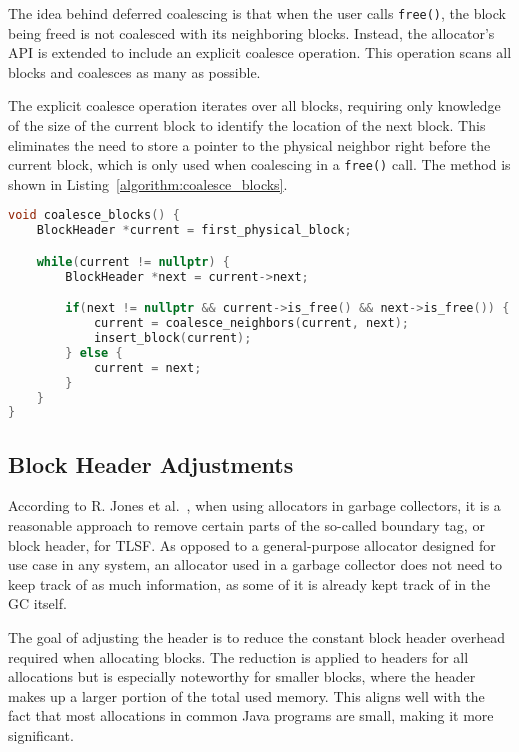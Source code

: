 The idea behind deferred coalescing is that when the user calls \texttt{free()}, the block being freed is not coalesced with its neighboring blocks. Instead, the allocator's API is extended to include an explicit coalesce operation. This operation scans all blocks and coalesces as many as possible.

The explicit coalesce operation iterates over all blocks, requiring only knowledge of the size of the current block to identify the location of the next block. This eliminates the need to store a pointer to the physical neighbor right before the current block, which is only used when coalescing in a \texttt{free()} call. The method is shown in Listing~\ref{algorithm:coalesce_blocks}.

\begin{lstlisting}[language=C++, caption={Method for explicitly coalescing all possible free blocks in the allocator. Note that coalesce\_neighbors() removes both blocks from the free-list before the newly coalesced block is inserted.}, label={algorithm:coalesce_blocks}]
void coalesce_blocks() {
    BlockHeader *current = first_physical_block;

    while(current != nullptr) {
        BlockHeader *next = current->next;

        if(next != nullptr && current->is_free() && next->is_free()) {
            current = coalesce_neighbors(current, next);
            insert_block(current);
        } else {
            current = next;
        }
    }
}
\end{lstlisting}

\subsection{Block Header Adjustments}
\label{sec:adaptations:block-header-adjustments}

According to R. Jones et al.~\cite[Page 103]{gchandbook}, when using allocators in garbage collectors, it is a reasonable approach to remove certain parts of the so-called boundary tag, or block header, for TLSF. As opposed to a general-purpose allocator designed for use case in any system, an allocator used in a garbage collector does not need to keep track of as much information, as some of it is already kept track of in the GC itself.

The goal of adjusting the header is to reduce the constant block header overhead required when allocating blocks. The reduction is applied to headers for all allocations but is especially noteworthy for smaller blocks, where the header makes up a larger portion of the total used memory. This aligns well with the fact that most allocations in common Java programs are small, making it more significant.

